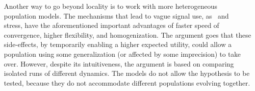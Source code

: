 \documentclass[a4paper]{article}
\begin{document}
Another way to go beyond locality is to work with more heterogeneous population models.
The mechanisms that lead to vague signal use, as~\textcite{oconnor_evolution_2014} and~\textcite{franke_vagueness_2017} stress, have the aforementioned important advantages of faster speed of convergence, higher flexibility, and homogenization.
The argument goes that these side-effects, by temporarily enabling a higher expected utility, could allow a population using some generalization (or affected by some imprecision) to take over.
However, despite its intuitiveness, the argument is based on comparing isolated runs of different dynamics.
The models do not allow the hypothesis to be tested, because they do not accommodate different populations evolving together.
%
\end{document}
